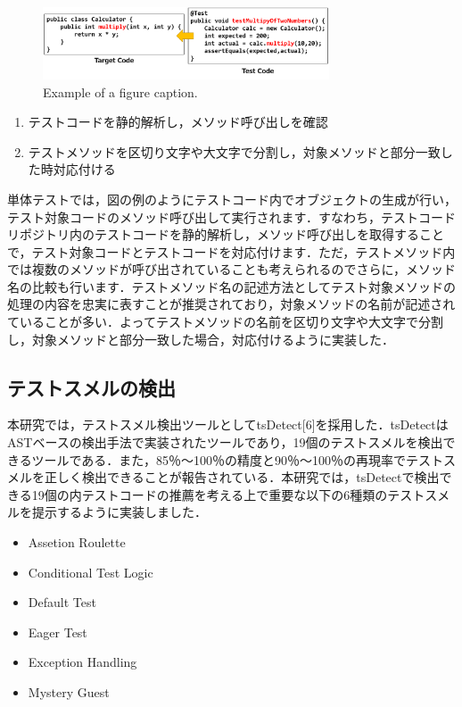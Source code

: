 \documentclass[conference]{IEEEtran}
\begin{document}
\begin{figure}[htbp]
\centerline{\includegraphics[width=8.5cm]{mapping.pdf}}
\caption{Example of a figure caption.}
\label{fig}
\end{figure}

\begin{enumerate}
\renewcommand{\labelenumi}{(\arabic{enumi})}
\item テストコードを静的解析し，メソッド呼び出しを確認
\item テストメソッドを区切り文字や大文字で分割し，対象メソッドと部分一致した時対応付ける
\end{enumerate}

単体テストでは，図の例のようにテストコード内でオブジェクトの生成が行い，テスト対象コードのメソッド呼び出して実行されます．すなわち，テストコードリポジトリ内のテストコードを静的解析し，メソッド呼び出しを取得することで，テスト対象コードとテストコードを対応付けます．ただ，テストメソッド内では複数のメソッドが呼び出されていることも考えられるのでさらに，メソッド名の比較も行います．テストメソッド名の記述方法としてテスト対象メソッドの処理の内容を忠実に表すことが推奨されており，対象メソッドの名前が記述されていることが多い．よってテストメソッドの名前を区切り文字や大文字で分割し，対象メソッドと部分一致した場合，対応付けるように実装した．

\subsection{テストスメルの検出}
本研究では，テストスメル検出ツールとしてtsDetect[6]を採用した．tsDetectはASTベースの検出手法で実装されたツールであり，19個のテストスメルを検出できるツールである．また，85％〜100％の精度と90％〜100％の再現率でテストスメルを正しく検出できることが報告されている．本研究では，tsDetectで検出できる19個の内テストコードの推薦を考える上で重要な以下の6種類のテストスメルを提示するように実装しました．

\begin{itemize}
\item Assetion Roulette
\item Conditional Test Logic
\item Default Test
\item Eager Test
\item Exception Handling
\item Mystery Guest
\end{itemize}
\end{document}
